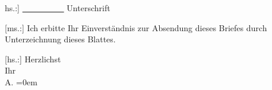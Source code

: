 \pstart
           \raggedleft{}{[}hs.:{]} \uline{          } Unterschrift\pend
           
\pstart
           {[}ms.:{]} Ich erbitte Ihr Einverständnis zur Absendung dieses
               Briefes durch Unterzeichnung dieses Blattes.\pend
           
\pstart
           {[}hs.:{]} Herzlichst{\\[\baselineskip]}Ihr{\\[\baselineskip]}\spacefill\mbox{A.}\pend
           \leftskip=0em{}\endnumbering{}  \newcommand{\dateiname}{L02410}\newcommand{\titel}{Arthur Schnitzler an Richard Beer-Hofmann, 27. 2. 1924}\newcommand{\editorInnen}{Martin Anton Müller und Gerd-Hermann Susen}
